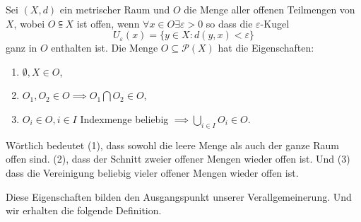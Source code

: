{
    Sei $(X,d)$ ein metrischer Raum und $O$ die Menge aller offenen Teilmengen von $X$,
    wobei $O \subseteqq X$ ist offen, wenn $\forall x \in O \exists \varepsilon > 0$ so dass die $\varepsilon$-Kugel
    $$
        U_\varepsilon(x) = \{ y \in X : d(y,x) < \varepsilon \}
    $$
    ganz in $O$ enthalten ist. 
    Die Menge $O \subseteq \mathcal{P}(X)$ hat die Eigenschaften:
    \begin{enumerate}
        \item $\emptyset, X \in O$,
        \item $O_1, O_2 \in O \implies O_1 \bigcap O_2 \in O$,
        \item $O_i \in O, i \in I$ Indexmenge beliebig $\implies \bigcup_{i \in I} O_i \in O$.
    \end{enumerate}
    Wörtlich bedeutet (1), dass sowohl die leere Menge als auch der ganze Raum
    offen sind. (2), dass der Schnitt zweier offener Mengen wieder offen ist.
    Und (3) dass die Vereinigung beliebig vieler offener Mengen wieder offen ist.
}

Diese Eigenschaften bilden den Ausgangspunkt unserer Verallgemeinerung. Und wir erhalten die folgende Definition.


